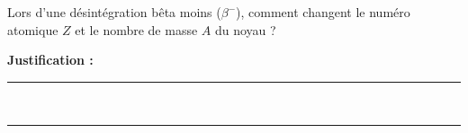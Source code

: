 Lors d'une désintégration bêta moins ($\beta^-$), comment changent le numéro atomique $Z$ et le nombre de masse $A$ du noyau ?

\choices

\noindent\textbf{Justification :} \hrulefill \\[2.5ex]
\rule{\linewidth}{0.4pt} \\[2.5ex]
\rule{\linewidth}{0.4pt}
\vfill
